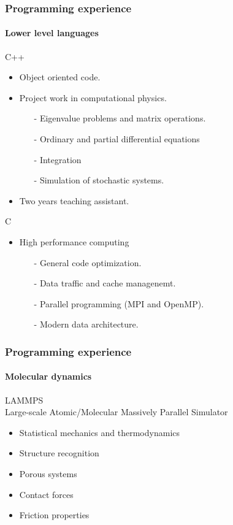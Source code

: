 \documentclass[
	10pt, %
]{beamer}
\begin{document}
\begin{frame}
	\frametitle{Programming experience}
	\framesubtitle{Lower level languages}

	{\large C++} 
	\begin{itemize}
		\item Object oriented code.
		\item Project work in computational physics.
		\begin{itemize}
			\item [-] Eigenvalue problems and matrix operations.
			\item [-] Ordinary and partial differential equations
			\item [-] Integration 
			\item [-] Simulation of stochastic systems.
		\end{itemize}
		\item Two years teaching assistant.
	\end{itemize}


	{\large C} 
	\begin{itemize}
		\item High performance computing 
		\begin{itemize}
			\item [-] General code optimization.
			\item [-] Data traffic and cache managenemt.
			\item [-] Parallel programming (MPI and OpenMP).
			\item [-] Modern data architecture.
		\end{itemize}
	\end{itemize}

\end{frame}


\begin{frame}
	\frametitle{Programming experience}
	\framesubtitle{Molecular dynamics}

	{\large LAMMPS} \\
	Large-scale Atomic/Molecular Massively Parallel Simulator
	\begin{itemize}
		\item Statistical mechanics and thermodynamics
		\item Structure recognition
		\item Porous systems 
		\item Contact forces
		\item Friction properties
	\end{itemize}


\end{frame}
\end{document}
